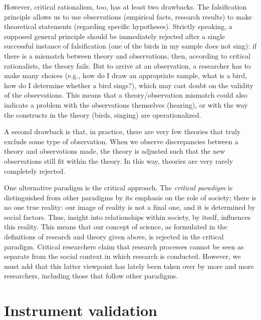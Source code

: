 \documentclass[
]{book}
\begin{document}
However, critical rationalism, too, has at least two drawbacks. The falsification principle allows us to use observations (empirical facts, research results) to make theoretical statements (regarding specific hypotheses). Strictly speaking, a supposed general principle should be immediately rejected after a single successful instance of falsification (one of the birds in my sample does not sing): if there is a mismatch between theory and observations, then, according to critical rationalists, the theory fails. But to arrive at an observation, a researcher has to make many choices (e.g., how do I draw an appropriate sample, what is a bird, how do I determine whether a bird sings?), which may cast doubt on the validity of the observations. This means that a theory/observation mismatch could also indicate a problem with the observations themselves (hearing), or with the way the constructs in the theory (birds, singing) are operationalized.

A second drawback is that, in practice, there are very few theories that truly exclude some type of observation. When we observe discrepancies between a theory and observations made, the theory is adjusted such that the new observations still fit within the theory. In this way, theories are very rarely completely rejected.

One alternative paradigm is the critical approach. The \emph{critical paradigm} is distinguished from other paradigms by its emphasis on the role of society; there is no one true reality: our image of reality is not a final one, and it is determined by social factors. Thus, insight into relationships within society, by itself, influences this reality. This means that our concept of science, as formulated in the definitions of research and theory given above, is rejected in the critical paradigm. Critical researchers claim that research processes cannot be seen as separate from the social context in which research is conducted. However, we must add that this latter viewpoint has lately been taken over by more and more researchers, including those that follow other paradigms.

\section{Instrument validation}\label{sec:instrument-validation}
\end{document}
